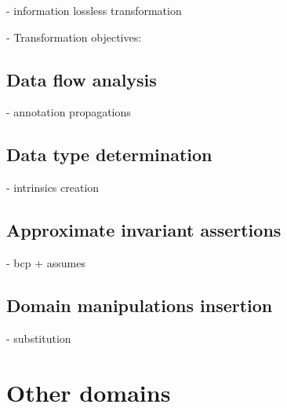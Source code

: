 - information lossless transformation

- Transformation objectives:

\subsection{Data flow analysis}
    - annotation propagations

\subsection{Data type determination}
    - intrinsics creation

\subsection{Approximate invariant assertions}
    - bcp + assumes

\subsection{ Domain manipulations insertion }
    - substitution

\section{ Other domains }
